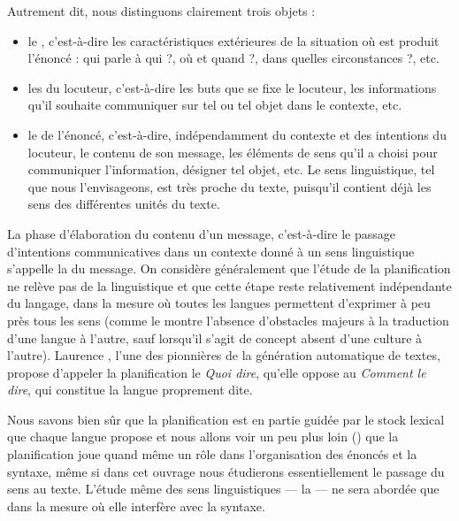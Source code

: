 Autrement dit, nous distinguons clairement trois objets :

\begin{itemize}
\item le , c’est-à-dire les caractéristiques extérieures de la situation où est produit l’énoncé : qui parle à qui ?, où et quand ?, dans quelles circonstances ?, etc.
\item les  du locuteur, c’est-à-dire les buts que se fixe le locuteur, les informations qu’il souhaite communiquer sur tel ou tel objet dans le contexte, etc.
\item le  de l’énoncé, c’est-à-dire, indépendamment du contexte et des intentions du locuteur, le contenu de son message, les éléments de sens qu’il a choisi pour communiquer l’information, désigner tel objet, etc. Le sens linguistique, tel que nous l’envisageons, est très proche du texte, puisqu’il contient déjà les sens des différentes unités du texte.
\end{itemize}

La phase d’élaboration du contenu d’un message, c’est-à-dire le passage d’intentions communicatives dans un contexte donné à un sens linguistique s’appelle la  du message. On considère généralement que l’étude de la planification ne relève pas de la linguistique et que cette étape reste relativement indépendante du langage, dans la mesure où toutes les langues permettent d’exprimer à peu près tous les sens (comme le montre l’absence d’obstacles majeurs à la traduction d’une langue à l’autre, sauf lorsqu’il s’agit de concept absent d’une culture à l’autre). Laurence \citet{danlos1987generation}, l’une des pionnières de la génération automatique de textes, propose d’appeler la planification le \textit{Quoi dire}, qu’elle oppose au \textit{Comment le dire}, qui constitue la langue proprement dite.

Nous savons bien sûr que la planification est en partie guidée par le stock lexical que chaque langue propose et nous allons voir un peu plus loin () que la planification joue quand même un rôle dans l’organisation des énoncés et la syntaxe, même si dans cet ouvrage nous étudierons essentiellement le passage du sens au texte. L’étude même des sens linguistiques — la  — ne sera abordée que dans la mesure où elle interfère avec la syntaxe.

